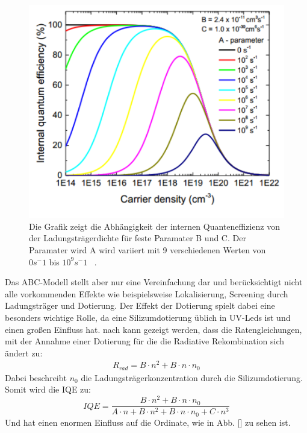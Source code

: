 \begin{figure}[tb]
    \centering
    \begin{minipage}[t]{0.5\linewidth}
        \centering
        \includegraphics[width=\linewidth]{Bilder/IQEabhA.png}
        \caption{Die Grafik zeigt die Abhängigkeit der internen Quanteneffizienz von der Ladungsträgerdichte für feste Paramater B und C. Der Paramater wird A wird variiert mit 9 verschiedenen Werten von $0 s^-1 $ bis $10^9 s^-1$ ~\cite{semreich}.}
        \label{fig:abha}
    \end{minipage}%
\end{figure}
\vspace{1cm}
\raggedright
%
Das ABC-Modell stellt aber nur eine Vereinfachung dar und berücksichtigt nicht alle vorkommenden Effekte wie beispielsweise Lokalisierung, Screening durch Ladungsträger und Dotierung. 
Der Effekt der Dotierung spielt dabei eine besonders wichtige Rolle, da eine Silizumdotierung üblich in UV-Leds ist und einen großen Einfluss hat.
nach \cite{schub} kann gezeigt werden, dass die Ratengleichungen, mit der Annahme einer Dotierung für die 
die Radiative Rekombination sich ändert zu:
\begin{align}
    R_{rad} = B \cdot n^2 + B \cdot n \cdot n_{0}
\end{align}
Dabei beschreibt $n_{0}$ die Ladungsträgerkonzentration durch die Silizumdotierung. 
Somit wird die IQE zu:
\begin{equation}
    IQE = \frac{B \cdot n^2 + B \cdot n \cdot n_{0}}{A \cdot n + B \cdot n^2  + B \cdot n \cdot n_{0}+ C \cdot n^3} 
    \label{}
\end{equation}
Und hat einen enormen Einfluss auf die Ordinate, wie in Abb. [] zu sehen ist.
%